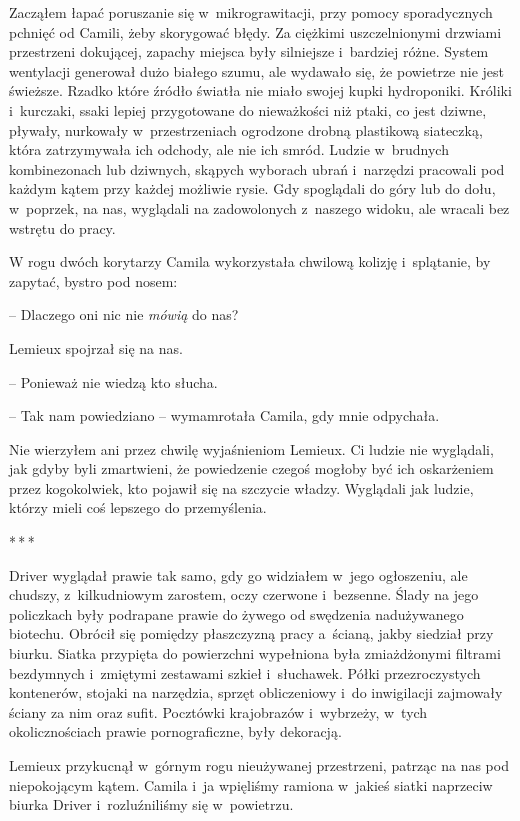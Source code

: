 \documentclass[oneside,polish,12pt,sfheadings]{mwbk}
\newcommand{\threeast}{\bigskip\par\centerline{*\,*\,*}\medskip\par}%
\begin{document}
Zacząłem łapać poruszanie się w~mikrograwitacji, przy pomocy
sporadycznych pchnięć od Camili, żeby skorygować błędy. Za ciężkimi
uszczelnionymi drzwiami przestrzeni dokującej, zapachy miejsca były
silniejsze i~bardziej różne. System wentylacji generował dużo białego
szumu, ale wydawało się, że powietrze nie jest świeższe. Rzadko które
źródło światła nie miało swojej kupki hydroponiki. Króliki i~kurczaki,
ssaki lepiej przygotowane do nieważkości niż ptaki, co jest dziwne,
pływały, nurkowały w~przestrzeniach ogrodzone drobną plastikową
siateczką, która zatrzymywała ich odchody, ale nie ich smród. Ludzie w~brudnych kombinezonach lub dziwnych, skąpych wyborach ubrań i~narzędzi
pracowali pod każdym kątem przy każdej możliwie rysie. Gdy spoglądali do
góry lub do dołu, w~poprzek, na nas, wyglądali na zadowolonych z~naszego
widoku, ale wracali bez wstrętu do pracy.

W rogu dwóch korytarzy Camila wykorzystała chwilową kolizję i~splątanie,
by zapytać, bystro pod nosem: 

-- Dlaczego oni nic nie \emph{mówią} do
nas?

Lemieux spojrzał się na nas. 

-- Ponieważ nie wiedzą kto słucha.

-- Tak nam powiedziano -- wymamrotała Camila, gdy mnie odpychała.

Nie wierzyłem ani przez chwilę wyjaśnieniom Lemieux. Ci ludzie nie
wyglądali, jak gdyby byli zmartwieni, że powiedzenie czegoś mogłoby być
ich oskarżeniem przez kogokolwiek, kto pojawił się na szczycie władzy.
Wyglądali jak ludzie, którzy mieli coś lepszego do przemyślenia.

\threeast

Driver wyglądał prawie tak samo, gdy go widziałem w~jego ogłoszeniu, ale
chudszy, z~kilkudniowym zarostem, oczy czerwone i~bezsenne. Ślady na
jego policzkach były podrapane prawie do żywego od swędzenia
nadużywanego biotechu. Obrócił się pomiędzy płaszczyzną pracy a~ścianą,
jakby siedział przy biurku. Siatka przypięta do powierzchni wypełniona
była zmiażdżonymi filtrami bezdymnych i~zmiętymi zestawami szkieł i~słuchawek. Półki przezroczystych kontenerów, stojaki na narzędzia,
sprzęt obliczeniowy i~do inwigilacji zajmowały ściany za nim oraz sufit.
Pocztówki krajobrazów i~wybrzeży, w~tych okolicznościach prawie
pornograficzne, były dekoracją.

Lemieux przykucnął w~górnym rogu nieużywanej przestrzeni, patrząc na nas
pod niepokojącym kątem. Camila i~ja wpięliśmy ramiona w~jakieś siatki
naprzeciw biurka Driver i~rozluźniliśmy się w~powietrzu.
\end{document}
